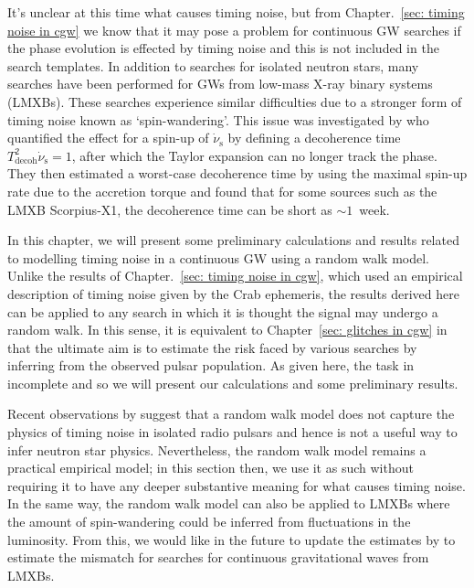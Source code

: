 \documentclass[../full_thesis/full_thesis.tex]{subfiles}
\begin{document}
It's unclear at this time what causes timing noise, but from
Chapter.~\ref{sec: timing noise in cgw} we know that it may pose a problem for
continuous GW searches if the phase evolution is effected by timing noise and
this is not included in the search templates. In addition to searches for
isolated neutron stars, many searches \citep[see for
example][]{ligo2015scox1,leaci2015,ScoX1:MDC1} have been performed for GWs from
low-mass X-ray binary systems (LMXBs). These searches experience similar
difficulties due to a stronger form of timing noise known as `spin-wandering'.
This issue was investigated by \citet{watts2008} who quantified the effect for
a spin-up of $\dot{\nu}_{\textrm{s}}$ by defining a decoherence time
$T_{\textrm{decoh}}^{2} \dot{\nu}_{\textrm{s}} = 1$, after which the Taylor
expansion can no longer track the phase.  They then estimated a worst-case
decoherence time by using the maximal spin-up rate due to the accretion torque
and found that for some sources such as the LMXB Scorpius-X1, the decoherence
time can be short as $\sim 1$~week.

In this chapter, we will present some preliminary calculations and results
related to modelling timing noise in a continuous GW using a random walk model.
Unlike the results of Chapter.~\ref{sec: timing noise in cgw}, which used an
empirical description of timing noise given by the Crab ephemeris, the results
derived here can be applied to any search in which it is thought the signal may
undergo a random walk. In this sense, it is equivalent to Chapter~\ref{sec:
glitches in cgw} in that the ultimate aim is to estimate the risk faced by
various searches by inferring from the observed pulsar population.  As given
here, the task in incomplete and so we will present our calculations and
some preliminary results.

Recent observations by \citet{Hobbs2010} suggest that a random walk model does
not capture the physics of timing noise in isolated radio pulsars and hence is
not a useful way to infer neutron star physics. Nevertheless, the random walk
model remains a practical empirical model; in this section then, we use it as
such without requiring it to have any deeper substantive meaning for what
causes timing noise. In the same way, the random walk model can also be applied
to LMXBs where the amount of spin-wandering could be inferred from fluctuations
in the luminosity. From this, we would like in the future to update the estimates by
\citet{watts2008} to estimate the mismatch for searches for continuous gravitational
waves from LMXBs.
\end{document}
